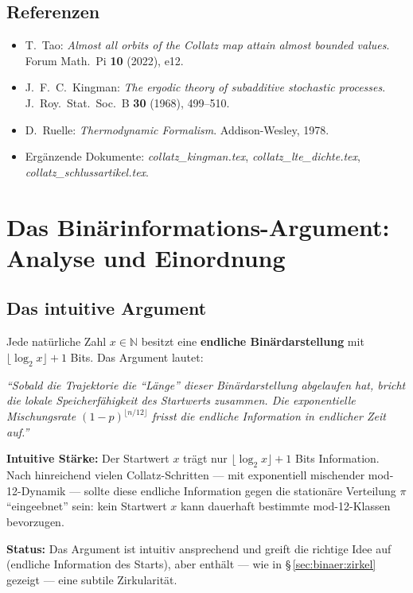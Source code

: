 \documentclass[12pt,a4paper]{article}
\newcommand{\N}{\mathbb{N}}
\begin{document}
\subsection{Referenzen}

\begin{itemize}
  \item T.\ Tao: \textit{Almost all orbits of the Collatz map attain almost
    bounded values}. Forum Math.\ Pi \textbf{10} (2022), e12.
  \item J.\ F.\ C.\ Kingman: \textit{The ergodic theory of subadditive stochastic
    processes}. J.\ Roy.\ Stat.\ Soc.\ B \textbf{30} (1968), 499--510.
  \item D.\ Ruelle: \textit{Thermodynamic Formalism}. Addison-Wesley, 1978.
  \item Ergänzende Dokumente: \textit{collatz\_kingman.tex},
    \textit{collatz\_lte\_dichte.tex}, \textit{collatz\_schlussartikel.tex}.
\end{itemize}

\section{Das Binärinformations-Argument: Analyse und Einordnung}
\label{sec:binaer}

\subsection{Das intuitive Argument}
\label{sec:binaer:intuitiv}

\begin{tcolorbox}[colback=orange!9, colframe=warnorange, fonttitle=\bfseries,
  title={Argument D: Endliche Binärinformation (vielversprechend, aber unvollständig)}]
Jede natürliche Zahl $x \in \N$ besitzt eine \textbf{endliche Binärdarstellung}
mit $\lfloor\log_2 x\rfloor + 1$ Bits. Das Argument lautet:

\medskip
\textit{``Sobald die Trajektorie die ``Länge'' dieser Binärdarstellung abgelaufen hat,
bricht die lokale Speicherfähigkeit des Startwerts zusammen. Die exponentielle
Mischungsrate $(1-p)^{\lfloor n/12\rfloor}$ frisst die endliche Information
in endlicher Zeit auf.''}

\medskip
\textbf{Intuitive Stärke:} Der Startwert $x$ trägt nur $\lfloor\log_2 x\rfloor + 1$
Bits Information. Nach hinreichend vielen Collatz-Schritten --- mit exponentiell
mischender mod-12-Dynamik --- sollte diese endliche Information gegen die
stationäre Verteilung $\pi$ ``eingeebnet'' sein: kein Startwert $x$ kann
dauerhaft bestimmte mod-12-Klassen bevorzugen.

\medskip
\textbf{Status:} Das Argument ist intuitiv ansprechend und greift die richtige
Idee auf (endliche Information des Starts), aber enthält --- wie in \S\,\ref{sec:binaer:zirkel}
gezeigt --- eine subtile Zirkularität.
\end{tcolorbox}
\end{document}
